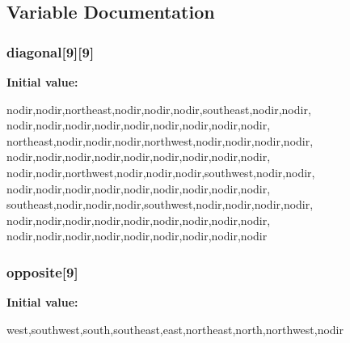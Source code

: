 \subsection{Variable Documentation}
\hypertarget{WL__STATE_8C_a10ebed132303227c107c0a505ebc4681}{
\subsubsection[{diagonal}]{ {\bf diagonal}\mbox{[}9\mbox{]}\mbox{[}9\mbox{]}}}
\label{WL__STATE_8C_a10ebed132303227c107c0a505ebc4681}
{\bfseries Initial value:}
\begin{DoxyCode}

{
        {nodir,nodir,northeast,nodir,nodir,nodir,southeast,nodir,nodir},
                        {nodir,nodir,nodir,nodir,nodir,nodir,nodir,nodir,nodir},
 {northeast,nodir,nodir,nodir,northwest,nodir,nodir,nodir,nodir},
                        {nodir,nodir,nodir,nodir,nodir,nodir,nodir,nodir,nodir},
  {nodir,nodir,northwest,nodir,nodir,nodir,southwest,nodir,nodir},
                        {nodir,nodir,nodir,nodir,nodir,nodir,nodir,nodir,nodir},
 {southeast,nodir,nodir,nodir,southwest,nodir,nodir,nodir,nodir},
                        {nodir,nodir,nodir,nodir,nodir,nodir,nodir,nodir,nodir},
                        {nodir,nodir,nodir,nodir,nodir,nodir,nodir,nodir,nodir}
}
\end{DoxyCode}
\hypertarget{WL__STATE_8C_a3787e913f047b454249a44046f17639d}{
\subsubsection[{opposite}]{ {\bf opposite}\mbox{[}9\mbox{]}}}
\label{WL__STATE_8C_a3787e913f047b454249a44046f17639d}
{\bfseries Initial value:}
\begin{DoxyCode}

        {west,southwest,south,southeast,east,northeast,north,northwest,nodir}
\end{DoxyCode}
